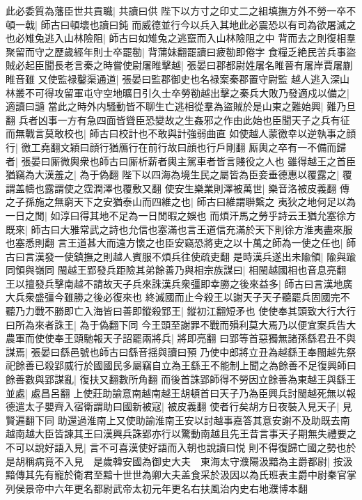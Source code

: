 此必委質為藩臣世共貢職|{
	共讀曰供}
陛下以方寸之印丈二之組填撫方外不勞一卒不頓一戟|{
	師古曰頓壞也讀曰鈍}
而威德並行今以兵入其地此必震恐以有司為欲屠滅之也必雉兔逃入山林險阻|{
	師古曰如雉兔之逃竄而入山林險阻之中}
背而去之則復相羣聚留而守之歷歲經年則士卒罷勌|{
	背蒲妹翻罷讀曰疲勌即倦字}
食糧乏絶民苦兵事盜賊必起臣聞長老言秦之時嘗使尉屠睢擊越|{
	張晏曰郡都尉姓屠名睢晉有屠岸賈屠蒯睢音雖}
又使監禄鑿渠通道|{
	張晏曰監郡御史也名禄案秦郡置守尉監}
越人逃入深山林叢不可得攻留軍屯守空地曠日引久士卒勞勌越出擊之秦兵大敗乃發適戍以備之|{
	適讀曰讁}
當此之時外内騷動皆不聊生亡逃相從羣為盜賊於是山東之難始興|{
	難乃旦翻}
兵者凶事一方有急四面皆聳臣恐變故之生姦邪之作由此始也臣聞天子之兵有征而無戰言莫敢校也|{
	師古曰校計也不敢與計強弱曲直}
如使越人蒙徼幸以逆執事之顔行|{
	徼工堯翻文穎曰顔行猶鴈行在前行故曰顔也行戶剛翻}
厮輿之卒有一不備而歸者|{
	張晏曰厮微輿衆也師古曰厮析薪者輿主駕車者皆言賤役之人也}
雖得越王之首臣猶竊為大漢羞之|{
	為于偽翻}
陛下以四海為境生民之屬皆為臣妾垂德惠以覆露之|{
	覆謂盖幬也露謂使之霑潤澤也覆敷又翻}
使安生樂業則澤被萬世|{
	樂音洛被皮義翻}
傳之子孫施之無窮天下之安猶泰山而四維之也|{
	師古曰維謂聨繫之}
夷狄之地何足以為一日之閒|{
	如淳曰得其地不足為一日閒暇之娛也}
而煩汗馬之勞乎詩云王猶允塞徐方既來|{
	師古曰大雅常武之詩也允信也塞滿也言王道信充滿於天下則徐方淮夷盡來服也塞悉則翻}
言王道甚大而遠方懷之也臣安竊恐將吏之以十萬之師為一使之任也|{
	師古曰言漢發一使鎮撫之則越人賓服不煩兵往使疏吏翻}
是時漢兵遂出未隃領|{
	隃與踰同領與嶺同}
閩越王郢發兵距險其弟餘善乃與相宗族謀曰|{
	相閩越國相也音息亮翻}
王以擅發兵擊南越不請故天子兵來誅漢兵衆彊即幸勝之後來益多|{
	師古曰言漢地廣大兵衆盛彊今雖勝之後必復來也}
終滅國而止今殺王以謝天子天子聽罷兵固國完不聽乃力戰不勝即亡入海皆曰善即鏦殺郢王|{
	鏦初江翻短矛也}
使使奉其頭致大行大行曰所為來者誅王|{
	為于偽翻下同}
今王頭至謝罪不戰而殞利莫大焉乃以便宜案兵告大農軍而使使奉王頭馳報天子詔罷兩將兵|{
	將即亮翻}
曰郢等首惡獨無諸孫繇君丑不與謀焉|{
	張晏曰繇邑號也師古曰繇音揺與讀曰預}
乃使中郎將立丑為越繇王奉閩越先祭祀餘善已殺郢威行於國國民多屬竊自立為王繇王不能制上聞之為餘善不足復興師曰餘善數與郢謀亂|{
	復扶又翻數所角翻}
而後首誅郢師得不勞因立餘善為東越王與繇王並處|{
	處昌呂翻}
上使莊助諭意南越南越王胡頓首曰天子乃為臣興兵討閩越死無以報德遣太子嬰齊入宿衛謂助曰國新被寇|{
	被皮義翻}
使者行矣胡方日夜裝入見天子|{
	見賢遍翻下同}
助還過淮南上又使助諭淮南王安以討越事嘉答其意安謝不及助既去南越南越大臣皆諫其王曰漢興兵誅郢亦行以驚動南越且先王昔言事天子期無失禮要之不可以說好語入見|{
	言不可喜漢使好語而入朝也說讀曰悦}
則不得復歸亡國之勢也於是胡稱病竟不入見　是歲韓安國為御史大夫　東海太守濮陽汲黯為主爵都尉|{
	按汲黯傳其先有寵於衛君至黯十世世為卿大夫盖食采於汲因以為氏班表主爵中尉秦官掌列侯景帝中六年更名都尉武帝太初元年更名右扶風治内史右地濮博本翻}
